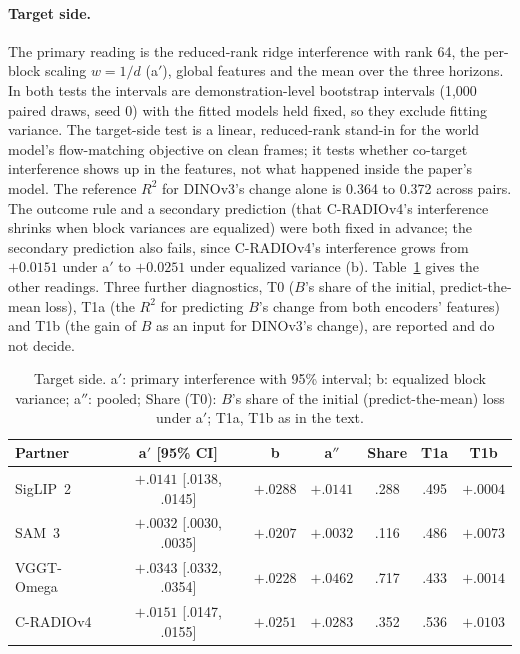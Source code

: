 \paragraph{Target side.}
The primary reading is the reduced-rank ridge interference with rank 64, the per-block scaling $w=1/d$ (a$'$), global features and the mean over the three horizons.
In both tests the intervals are demonstration-level bootstrap intervals (1,000 paired draws, seed 0) with the fitted models held fixed, so they exclude fitting variance.
The target-side test is a linear, reduced-rank stand-in for the world model's flow-matching objective on clean frames; it tests whether co-target interference shows up in the features, not what happened inside the paper's model.
The reference $R^2$ for DINOv3's change alone is 0.364 to 0.372 across pairs.
The outcome rule and a secondary prediction (that C-RADIOv4's interference shrinks when block variances are equalized) were both fixed in advance; the secondary prediction also fails, since C-RADIOv4's interference grows from $+0.0151$ under a$'$ to $+0.0251$ under equalized variance (b).
Table~\ref{tab:suppl-target} gives the other readings.
Three further diagnostics, T0 ($B$'s share of the initial, predict-the-mean loss), T1a (the $R^2$ for predicting $B$'s change from both encoders' features) and T1b (the gain of $B$ as an input for DINOv3's change), are reported and do not decide.

\begin{table}[t]
\centering
\small
\caption{Target side. a$'$: primary interference with 95\% interval; b: equalized block variance; a$''$: pooled; Share (T0): $B$'s share of the initial (predict-the-mean) loss under a$'$; T1a, T1b as in the text.}
\label{tab:suppl-target}
\begin{tabular}{@{}lcccccc@{}}
\toprule
Partner & a$'$ [95\% CI] & b & a$''$ & Share & T1a & T1b \\
\midrule
SigLIP~2 & $+.0141$ [.0138, .0145] & $+.0288$ & $+.0141$ & .288 & .495 & $+.0004$ \\
SAM~3 & $+.0032$ [.0030, .0035] & $+.0207$ & $+.0032$ & .116 & .486 & $+.0073$ \\
VGGT-Omega & $+.0343$ [.0332, .0354] & $+.0228$ & $+.0462$ & .717 & .433 & $+.0014$ \\
C-RADIOv4 & $+.0151$ [.0147, .0155] & $+.0251$ & $+.0283$ & .352 & .536 & $+.0103$ \\
\bottomrule
\end{tabular}
\end{table}

